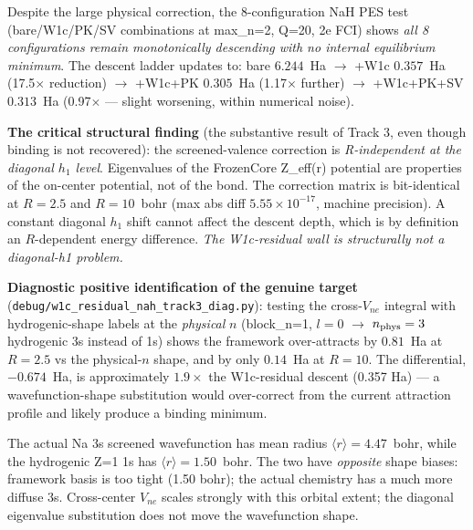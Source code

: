 \documentclass[aps,pra,twocolumn,superscriptaddress,longbibliography]{revtex4-2}
\begin{document}
Despite the large physical correction, the 8-configuration NaH PES
test (bare/W1c/PK/SV combinations at max\_n=2, Q=20, 2e FCI)
shows \emph{all 8 configurations remain monotonically descending with
no internal equilibrium minimum}. The descent ladder updates to:
bare $6.244$~Ha $\to$ +W1c $0.357$~Ha (17.5$\times$ reduction) $\to$
+W1c+PK $0.305$~Ha (1.17$\times$ further) $\to$ +W1c+PK+SV $0.313$~Ha
(0.97$\times$ --- slight worsening, within numerical noise).

\textbf{The critical structural finding} (the substantive result of
Track 3, even though binding is not recovered): the screened-valence
correction is \emph{R-independent at the diagonal $h_1$ level}.
Eigenvalues of the FrozenCore Z_{\rm eff}(r) potential are properties
of the on-center potential, not of the bond. The correction matrix
is bit-identical at $R = 2.5$ and $R = 10$~bohr (max abs diff
$5.55 \times 10^{-17}$, machine precision). A constant diagonal
$h_1$ shift cannot affect the descent depth, which is by definition
an $R$-dependent energy difference. \emph{The W1c-residual wall
is structurally not a diagonal-h1 problem.}

\textbf{Diagnostic positive identification of the genuine target}
(\texttt{debug/w1c\_residual\_nah\_track3\_diag.py}): testing the
cross-$V_{ne}$ integral with hydrogenic-shape labels at the
\emph{physical} $n$ (block\_n=1, $l=0$ $\to$ $n_{\rm phys}=3$ hydrogenic 3s
instead of 1s) shows the framework over-attracts by $0.81$~Ha at
$R = 2.5$ vs the physical-$n$ shape, and by only $0.14$~Ha at
$R = 10$. The differential, $-0.674$~Ha, is approximately
$1.9\times$ the W1c-residual descent (0.357 Ha) --- a
wavefunction-shape substitution would over-correct from the
current attraction profile and likely produce a binding minimum.

The actual Na 3s screened wavefunction has mean radius
$\langle r \rangle = 4.47$~bohr, while the hydrogenic Z=1 1s has
$\langle r \rangle = 1.50$~bohr. The two have \emph{opposite} shape
biases: framework basis is too tight (1.50 bohr); the actual
chemistry has a much more diffuse 3s. Cross-center $V_{ne}$ scales
strongly with this orbital extent; the diagonal eigenvalue
substitution does not move the wavefunction shape.
\end{document}
